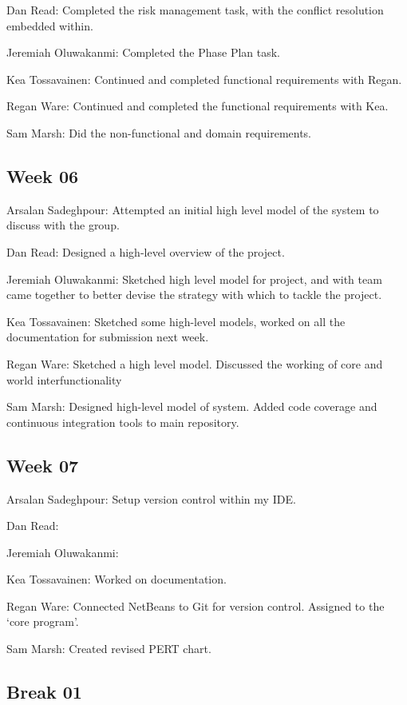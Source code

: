 \documentclass[11pt]{article}
\begin{document}
Dan Read: Completed the risk management task, with the conflict resolution embedded within.

Jeremiah Oluwakanmi: Completed the Phase Plan task.

Kea Tossavainen: Continued and completed functional requirements with Regan.

Regan Ware: Continued and completed the functional requirements with Kea.

Sam Marsh: Did the non-functional and domain requirements.

\subsection{Week 06}

Arsalan Sadeghpour: Attempted an initial high level model of the system to discuss with the group.

Dan Read: Designed a high-level overview of the project.

Jeremiah Oluwakanmi: Sketched high level model for project, and with team came together to better devise the strategy with which to tackle the project.

Kea Tossavainen: Sketched some high-level models, worked on all the documentation for submission next week.

Regan Ware: Sketched a high level model. Discussed the working of core and world interfunctionality

Sam Marsh: Designed high-level model of system. Added code coverage and continuous integration tools to main repository.

\subsection{Week 07}

Arsalan Sadeghpour: Setup version control within my IDE.

Dan Read:

Jeremiah Oluwakanmi:

Kea Tossavainen: Worked on documentation.

Regan Ware: Connected NetBeans to Git for version control. Assigned to the `core program'.

Sam Marsh: Created revised PERT chart.

\subsection{Break 01}
\end{document}
